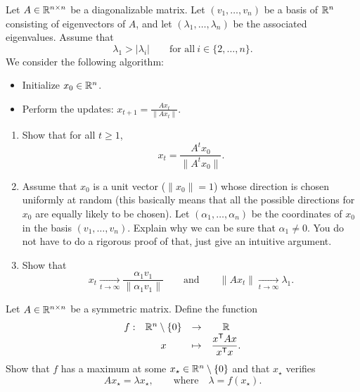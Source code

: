 \documentclass[11pt,nocut]{article}
\begin{document}
\begin{problem}[3 points]
	Let $A \in \mathbb{R}^{n \times n}$ be a diagonalizable matrix. Let $(v_1, \dots, v_n)$ be a basis of $\mathbb{R}^n$ consisting of eigenvectors of $A$, and let $(\lambda_1, \dots, \lambda_n)$ be the associated eigenvalues. Assume that
	$$
	\lambda_1 > |\lambda_i| \qquad \text{for all} \ i \in \{2, \dots, n\}.
	$$
	We consider the following algorithm:
	\begin{itemize}
		\item Initialize $x_0 \in \mathbb{R}^n$.
		\item Perform the updates: $x_{t+1} = \frac{A x_t}{\|A x_t\|}$.
	\end{itemize}
	\begin{enumerate}[label=\normalfont(\textbf{\alph*})]
		\item Show that for all $t \geq 1$, 
			$$
			x_t = \frac{A^t x_0}{\|A^t x_0\|}.
			$$
		\item Assume that $x_0$ is a unit vector ($\|x_0\|=1$) whose direction is chosen uniformly at random (this basically means that all the possible directions for $x_0$ are equally likely to be chosen). Let $(\alpha_1, \dots, \alpha_n)$ be the coordinates of $x_0$ in the basis $(v_1, \dots, v_n)$. Explain why we can be sure that $\alpha_1 \neq 0$. You do not have to do a rigorous proof of that, just give an intuitive argument.
		\item Show that
			$$
			x_t \xrightarrow[t \to \infty]{} \frac{\alpha_1 v_1}{\|\alpha_1 v_1\|}
			\qquad \text{and} \qquad
			\|A x_t\| \xrightarrow[t \to \infty]{} \lambda_1.
			$$
	\end{enumerate}
\end{problem}

\vspace{1mm}


\begin{problem}[$\star$]
	Let $A \in \mathbb{R}^{n \times n}$ be a symmetric matrix. Define the function
	$$
	\begin{array}{cccc}
		f:& \mathbb{R}^n \setminus \{0\} & \to & \mathbb{R} \\
				& x & \mapsto & \displaystyle \frac{x^{{\sf T}} A x}{x^{{\sf T}} x}.
	\end{array}
	$$
	Show that $f$ has a maximum at some $x_{\star} \in \mathbb{R}^n \setminus \{0\}$ and that $x_{\star}$ verifies
	$$
	A x_{\star} = \lambda x_{\star}, \qquad \text{where} \quad \lambda = f(x_{\star}).
	$$
\end{problem}
\vspace{1cm}
\centerline{}

%
%
\end{document}
